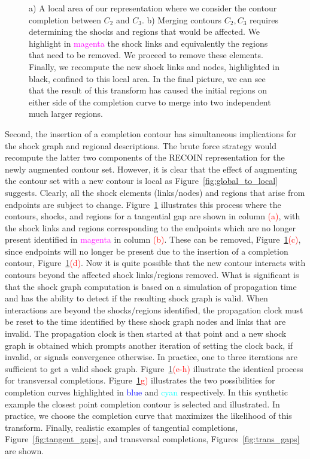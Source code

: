 \begin{figure}[!ht]
\caption{a) A local area of our representation where we consider the contour completion between $C_2$ and $C_3$. b) Merging contours $C_2,C_3$ requires determining the shocks and regions that would be affected. We highlight in \textcolor{magenta}{magenta} the shock links and equivalently the regions that need to be removed. We proceed to remove these elements. Finally, we recompute the new shock links and nodes, highlighted in black, confined to this local area. In the final picture, we can see that the result of this transform has caused the initial regions on either side of the completion curve to merge into two independent much larger regions.}
\label{fig:lc_steps}
\end{figure}



Second, the insertion of a completion contour has simultaneous implications for the shock graph and regional descriptions. The brute force strategy would recompute the latter two components of the RECOIN representation for the newly augmented contour set. However, it is clear that the effect of augmenting the contour set with a new contour is local as Figure~\ref{fig:global_to_local} suggests. Clearly, all the shock elements (links/nodes) and regions that arise from endpoints are subject to change. Figure~\ref{fig:lc_steps} illustrates this process where the contours, shocks, and regions for a tangential gap are shown in column \textcolor{red}{(a)}, with the shock links and regions corresponding to the endpoints which are no longer present identified in \textcolor{magenta}{magenta} in column \textcolor{red}{(b)}. These can be removed, Figure~\ref{fig:lc_steps}\textcolor{red}{(c)}, since endpoints will no longer be present due to the insertion of a completion contour, Figure~\ref{fig:lc_steps}\textcolor{red}{(d)}. Now it is quite possible that the new contour interacts with contours beyond the affected shock links/regions removed. What is significant is that the shock graph computation is based on a simulation of propagation time and has the ability to detect if the resulting shock graph is valid. When interactions are beyond the shocks/regions identified, the propagation clock must be reset to the time identified by these shock graph nodes and links that are invalid. The propagation clock is then started at that point and a new shock graph is obtained which prompts another iteration of setting the clock back, if invalid, or signals convergence otherwise. In practice, one to three iterations are sufficient to get a valid shock graph. Figure~\ref{fig:lc_steps}\textcolor{red}{(e-h)} illustrate the identical process for transversal completions. Figure~\ref{fig:lc_steps}\textcolor{red}{g)} illustrates the two possibilities for completion curves highlighted in \textcolor{blue}{blue} and \textcolor{cyan}{cyan} respectively. In this synthetic example the closest point completion contour is selected and illustrated. In practice, we choose the completion curve that maximizes the likelihood of this transform. Finally, realistic examples of tangential completions, Figure~\ref{fig:tangent_gaps}, and transversal completions, Figures~\ref{fig:trans_gaps} are shown. 

